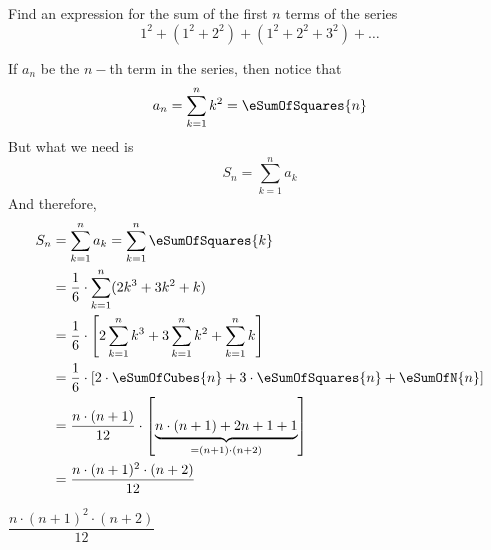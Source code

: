 

\question[3] Find an expression for the sum of the first $n$ terms of the series 
\[ 1^2 + (1^2+2^2) + (1^2+2^2+3^2) + \ldots \]

\begin{solution}[\halfpage]
  If $a_n$ be the $n-$th term in the series, then notice that 
  \[ a_n = \sum_{k=1}^n k^2 = \eSumOfSquares{n} \]
  But what we need is 
  \[ S_n = \sum_{k=1}^n a_k \]
  And therefore, 
	\begin{align}
		S_n &= \sum_{k=1}^n a_k = \sum_{k=1}^{n} \eSumOfSquares{k} \\
		&= \dfrac{1}{6}\cdot\sum_{k=1}^{n}(2k^3+3k^2+k) \\ 
    &= \dfrac{1}{6}\cdot\left[ 2\sum_{k=1}^{n} k^3 + 3\sum_{k=1}^{n} k^2 + \sum_{k=1}^{n} k \right] \\
		&= \dfrac{1}{6}\cdot\left[ 2\cdot\eSumOfCubes{n} + 3\cdot\eSumOfSquares{n} + \eSumOfN{n}\right] \\
		&= \dfrac{n\cdot(n+1)}{12}\cdot\left[ \underbrace{n\cdot(n+1) + 2n + 1 + 1}_{=(n+1)\cdot(n+2)}\right]\\
		&= \dfrac{n\cdot(n+1)^2\cdot(n+2)}{12}
	\end{align}
\end{solution}
\ifprintanswers\begin{codex}$\dfrac{n\cdot (n+1)^2\cdot (n+2)}{12}$\end{codex}\fi
